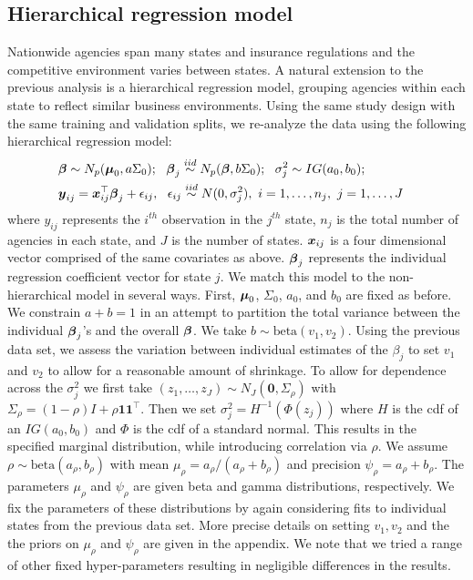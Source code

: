 \documentclass[11pt]{article}
\def\bbeta{\mbox{\boldmath $\beta$}}
\def\bmu{\mbox{\boldmath $\mu$}}
\newcommand{\bx}{\mbox{\boldmath $x$}}
\newcommand{\by}{\mbox{\boldmath $y$}}
\newcommand{\mb}{\mathbf}
\newcommand{\iid}{\stackrel{iid}{\sim}}
\begin{document}
\subsection{Hierarchical regression model}
\label{hierRegNW}
Nationwide agencies span many states and insurance regulations and the competitive environment varies between states. A natural extension to the previous analysis is a hierarchical regression model, grouping agencies within each state to reflect similar business environments. Using the same study design with the same training and validation splits, we re-analyze the data using the following hierarchical regression model:
\begin{align}
\label{eq:hierModel}
&\bbeta\sim N_p(\bmu_0, a\Sigma_0);\ \ 
\bbeta_j\iid N_p(\bbeta, b\Sigma_0); \ \  
\sigma_j^2\sim IG(a_0,b_0);  & \\ \nonumber
& \by_{ij}=\bx_{ij}^\top\bbeta_j+\epsilon_{ij},\ \ \epsilon_{ij}\iid N(0, \sigma_j^2),\ i=1,\dots, n_j,\ j=1,\dots, J &
\end{align}
where $y_{ij}$  represents the $i^{th}$ observation in the $j^{th}$
state, $n_j$ is the total number of agencies in each state, and $J$ is
the number of states. $\bx_{ij}$ is a four dimensional vector
comprised of the same covariates as above. $\bbeta_j$ represents the
individual regression coefficient vector for state $j$.  We match this
model to the non-hierarchical model in several ways. First, $\bmu_0$,
$\Sigma_0$, $a_0$, and $b_0$ are fixed as before. We constrain $a+b=1$
in an attempt to partition the total variance between the individual
$\bbeta_j$'s and the overall $\bbeta$. We take $b\sim
\text{beta}(v_1,v_2)$. Using the previous data set, we assess the
variation between individual estimates of the $\beta_j$ to set $v_1$
and $v_2$ to allow for a reasonable amount of shrinkage. To allow for
dependence across the $\sigma_j^2$ we first take
$(z_1,\dots,z_J)\sim N_J(\mathbf{0}, \Sigma_\rho)$ with
$\Sigma_\rho=(1-\rho)I+\rho \mb{1}\mb{1}^{\top}$. Then we set
$\sigma^2_j=H^{-1}(\Phi(z_j))$ where $H$ is the cdf of an
$IG(a_0,b_0)$ and $\Phi$ is the cdf of a standard normal. This results in the specified marginal distribution, while
introducing correlation via $\rho$. We assume $\rho\sim
\text{beta}(a_\rho,b_\rho)$ with mean $\mu_\rho=a_\rho/(a_\rho+b_\rho)$ and precision
$\psi_\rho=a_\rho+b_\rho$. The parameters $\mu_\rho$ and
$\psi_{\rho}$  are given beta and gamma distributions, respectively. We fix the parameters of these distributions by again considering fits to individual states from the previous data set. More precise details on setting $v_{1}, v_{2}$ and the the priors on $\mu_{\rho}$ and $\psi_{\rho}$ are given in the appendix. We note that we tried a range of other fixed hyper-parameters resulting in negligible differences in the results. 
\end{document}
